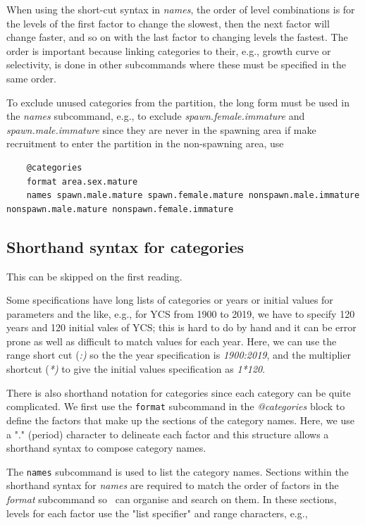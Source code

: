 When using the short-cut syntax in \textit{names}, the order of level combinations is for the levels of the first factor to change the slowest, then the next factor will change faster, and so on with the last factor to changing levels the  fastest. The order is important because linking categories to their, e.g., growth curve or selectivity, is done in other subcommands where these must be specified in the same order.

To exclude unused categories from the partition, the long form must be used in the \textit{names} subcommand, e.g., to exclude  \textit{spawn.female.immature} and \textit{spawn.male.immature} since they are never in the spawning area if make recruitment to enter the partition in  the non-spawning area, use

{\small{\begin{lstlisting}
	@categories
	format area.sex.mature
	names spawn.male.mature spawn.female.mature nonspawn.male.immature nonspawn.male.mature nonspawn.female.immature   
\end{lstlisting}}}

\subsection{Shorthand syntax for categories}\label{sec:ShorthandSyntax-section}
This can be skipped on the first reading.

Some specifications have long lists of categories or years or initial values for parameters and the like, e.g., for YCS from 1900 to 2019, we have to specify 120 years and 120 initial vales of YCS; this is hard to do by hand and it can be error prone as well as difficult to match values for each year. Here, we can use the range short cut (\textit{:)} so the  the year specification is \textit{1900:2019}, and the multiplier shortcut (\textit{*)} to give the initial values specification as \textit{1*120}.

There is also shorthand notation for categories since 
 each category can be quite complicated. \label{sub:categories}
 We first use the \texttt{format} subcommand in the \textit{@categories} block to define the factors that make up the sections of the category names. Here, we use a "." (period) character to delineate each factor and this structure allows a shorthand syntax to compose category names. 

The \texttt{names} subcommand is used to list the category names. Sections within the shorthand syntax for \textit{names} are required to match the order of factors in the \textit{format} subcommand so \CNAME\ can organise and search on them. In these sections, levels for each factor use the "list specifier" and range characters, e.g.,

